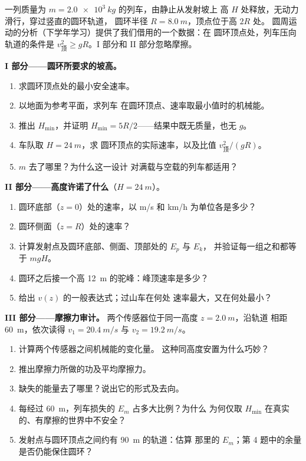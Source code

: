 \begin{problem}
\label{pb:g11:mechanical-energy:1}
一列质量为 $m = \qty{2.0e3}{kg}$ 的列车，由静止从发射坡上
高 $H$ 处释放，无动力滑行，穿过竖直的圆环轨道，
圆环半径 $R = \qty{8.0}{m}$，顶点位于高 $2R$ 处。
圆周运动的分析（下学年学习）提供了我们借用的一个数据：在
圆环顶点处，列车压向轨道的条件是
$v_{\text{顶}}^2 \geq gR$。I 部分和 II 部分忽略摩擦。

\medskip
\noindent\textbf{I 部分——圆环所要求的坡高。}
\begin{enumerate}
  \item 求圆环顶点处的最小安全速率。
  \item 以地面为参考平面，求列车
        在圆环顶点、速率取最小值时的机械能。
  \item 推出 $H_{\min}$，并证明 $H_{\min} = 5R/2$——结果中既无质量，也无 $g$。
  \item 车队取 $H = \qty{24}{m}$，求
        圆环顶点的实际速率，以及比值 $v_{\text{顶}}^2/(gR)$。
  \item $m$ 去了哪里？为什么这一设计
        对满载与空载的列车都适用？
\end{enumerate}

\medskip
\noindent\textbf{II 部分——高度许诺了什么}（$H = \qty{24}{m}$）。
\begin{enumerate}[resume]
  \item 圆环底部（$z = 0$）处的速率，以 \unit{m/s} 和
        \unit{km/h} 为单位各是多少？
  \item 圆环侧面（$z = R$）处的速率？
  \item 计算发射点及圆环底部、侧面、顶部处的 $E_p$ 与 $E_k$，
        并验证每一组之和都等于 $mgH$。
  \item 圆环之后接一个高 \qty{12}{m} 的驼峰：峰顶速率是多少？
  \item 给出 $v(z)$ 的一般表达式；过山车在何处
        速率最大，又在何处最小？
\end{enumerate}

\medskip
\noindent\textbf{III 部分——摩擦力审计。}
两个传感器位于同一高度 $z = \qty{2.0}{m}$，沿轨道
相距 \qty{60}{m}，依次读得 $v_1 = \qty{20.4}{m/s}$ 与 $v_2 = \qty{19.2}{m/s}$。
\begin{enumerate}[resume]
  \item 计算两个传感器之间机械能的变化量。
        这种同高度安置为什么巧妙？
  \item 推出摩擦力所做的功及平均摩擦力。
  \item 缺失的能量去了哪里？说出它的形式及去向。
  \item 每经过 \qty{60}{m}，列车损失的 $E_m$ 占多大比例？为什么
        为何仅取 $H_{\min}$ 在真实的、有摩擦的世界中不安全？
  \item 发射点与圆环顶点之间约有 \qty{90}{m} 的轨道：估算
        那里的 $E_m$；第 4 题中的余量是否仍能保住圆环？
\end{enumerate}


\end{problem}
